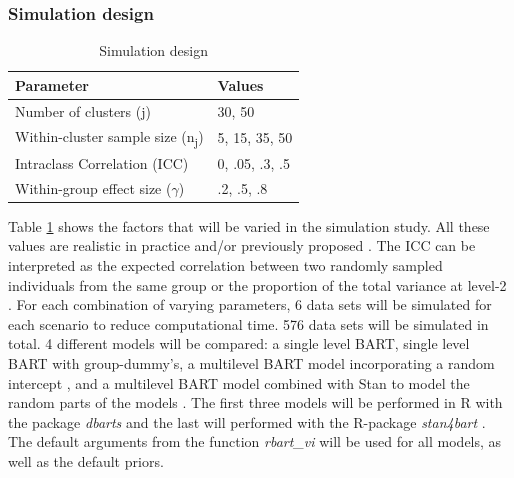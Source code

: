 \documentclass[10pt, a4paper, titlepage]{article}
\begin{document}
\subsubsection{Simulation design}
\begin{table}
\centering
\caption{Simulation design}
\label{tab:simulationparameters}
\begin{tabular}{l|l}
\textbf{Parameter}                                  & \textbf{Values} \\ \hline
Number of clusters (j)                              & 30, 50          \\
Within-cluster sample size (n\textsubscript{j})     & 5, 15, 35, 50   \\
Intraclass Correlation (ICC)                        & 0, .05, .3, .5  \\
Within-group effect size ($\gamma$)                 & .2, .5, .8
\end{tabular}
\end{table}

Table \ref{tab:simulationparameters} shows the factors that will be varied in the simulation study. All these values are realistic in practice and/or previously proposed \citep{gulliford1999, murray2003, hox2017, grund2018, enders2018a, enders2020}. The ICC can be interpreted as the expected correlation between two randomly sampled individuals from the same group or the proportion of the total variance at level-2 \citep{gulliford2005, shieh2012, hox2011}. For each combination of varying parameters, 6 data sets will be simulated for each scenario to reduce computational time. 576 data sets will be simulated in total. 4 different models will be compared: a single level BART, single level BART with group-dummy's, a multilevel BART model incorporating a random intercept \citep{chen2020, wagner2020, tan2016, wundervald2022}, and a multilevel BART model combined with Stan to model the random parts of the models \citep{dorie2022}. The first three models will be performed in R \citep{rcoreteam2023} with the package \textit{dbarts} \citep{dorie2023} and the last will performed with the R-package \textit{stan4bart} \citep{dorie2023a}. The default arguments from the function \textit{rbart\_vi} will be used for all models, as well as the default priors.
\end{document}
